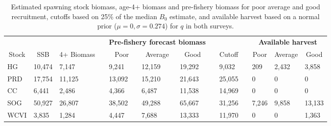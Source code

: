 %
\begin{table}[!tbp]
 \small
 \caption{Estimated spawning stock biomass,  age-4+ biomass and pre-fishery biomass for poor average and good recruitment,  cutoffs based on 25\% of the median $B_0$ estimate, and available harvest based on a normal prior ($\mu=0,\sigma=0.274$) for $q$ in both surveys.\label{TableCatchAdvice}} 
 \begin{center}
 \begin{tabular}{lllclllclclll}\hline\hline
\multicolumn{3}{c}{\bfseries }&
\multicolumn{1}{c}{\bfseries }&
\multicolumn{3}{c}{\bfseries Pre-fishery forecast biomass}&
\multicolumn{1}{c}{\bfseries }&
\multicolumn{1}{c}{\bfseries }&
\multicolumn{1}{c}{\bfseries }&
\multicolumn{3}{c}{\bfseries Available harvest}
\tabularnewline \cline{1-13}
\multicolumn{1}{c}{Stock}&\multicolumn{1}{c}{SSB}&\multicolumn{1}{c}{4+ Biomass}&\multicolumn{1}{c}{}&\multicolumn{1}{c}{Poor}&\multicolumn{1}{c}{Average}&\multicolumn{1}{c}{Good}&\multicolumn{1}{c}{}&\multicolumn{1}{c}{Cutoff}&\multicolumn{1}{c}{}&\multicolumn{1}{c}{Poor}&\multicolumn{1}{c}{Average}&\multicolumn{1}{c}{Good}\tabularnewline
\hline
HG&10,474& 7,147&& 9,241&12,159&19,292&& 9,032&&   209& 2,432& 3,858\tabularnewline
PRD&17,754&11,125&&13,092&15,210&21,643&&25,055&&     0&     0&     0\tabularnewline
CC& 6,441& 2,486&& 4,366& 6,487&11,538&&14,969&&     0&     0&     0\tabularnewline
SOG&50,927&26,807&&38,502&49,288&65,667&&31,256&& 7,246& 9,858&13,133\tabularnewline
WCVI& 3,835& 1,284&& 4,447& 7,688&13,333&&11,970&&     0&     0& 1,363\tabularnewline
\hline
\end{tabular}

\end{center}

\end{table}

